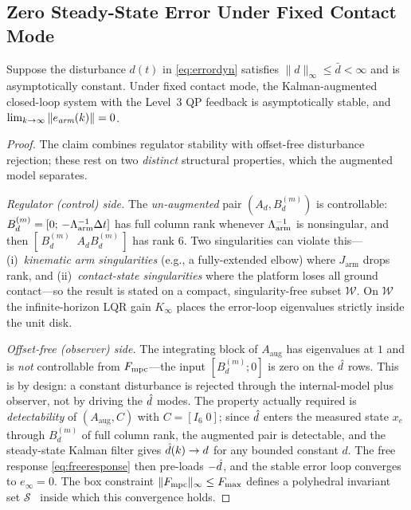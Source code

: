 \subsection{Zero Steady-State Error Under Fixed Contact Mode}

\begin{theorem}\label{thm:zss}
Suppose the disturbance $d(t)$ in \eqref{eq:errordyn} satisfies
$\|d\|_\infty\leq\bar{d}<\infty$ and is asymptotically constant.
Under fixed contact mode, the Kalman-augmented closed-loop system with the
Level~3 QP feedback is asymptotically stable, and
$\lim_{k\to\infty}\|e_{\emph{arm}}(k)\|=0$.
\end{theorem}

\begin{proof}
The claim combines regulator stability with offset-free disturbance rejection;
these rest on two \emph{distinct} structural properties, which the augmented
model separates.

\emph{Regulator (control) side.} The \emph{un-augmented} pair
$(A_d,B_d^{(m)})$ is controllable: $B_d^{(m)}=[0;\,-\Lambda_{\text{arm}}^{-1}\Delta t]$ has
full column rank whenever $\Lambda_{\text{arm}}^{-1}$ is nonsingular, and then
$[\,B_d^{(m)}\;\; A_dB_d^{(m)}\,]$ has rank $6$. Two singularities can violate
this---(i)~\emph{kinematic arm singularities} (e.g., a fully-extended elbow)
where $J_{\text{arm}}$ drops rank, and (ii)~\emph{contact-state singularities}
where the platform loses all ground contact---so the result is stated on a
compact, singularity-free subset $\mathcal{W}$. On $\mathcal{W}$ the
infinite-horizon LQR gain $K_\infty$ places the error-loop eigenvalues strictly
inside the unit disk.

\emph{Offset-free (observer) side.} The integrating block of
$A_{\text{aug}}$ has eigenvalues at $1$ and is \emph{not} controllable from
$F_{\text{mpc}}$---the input $[B_d^{(m)};0]$ is zero on the $\hat{d}$ rows. This is by
design: a constant disturbance is rejected through the internal-model plus
observer, not by driving the $\hat{d}$ modes. The property actually required is
\emph{detectability} of $(A_{\text{aug}},C)$ with $C=[I_6\;0]$; since $\hat{d}$
enters the measured state $x_e$ through $B_d^{(m)}$ of full column rank, the
augmented pair is detectable, and the steady-state Kalman filter gives
$\hat{d}(k)\to d$ for any bounded constant $d$. The free response
\eqref{eq:freeresponse} then pre-loads $-\hat{d}$, and the stable error loop
converges to $e_\infty=0$. The box constraint $\|F_{\text{mpc}}\|_\infty\le F_{\max}$
defines a polyhedral invariant set $\mathcal{S}$~\cite{cao2002antiwindup} inside
which this convergence holds.
\end{proof}

